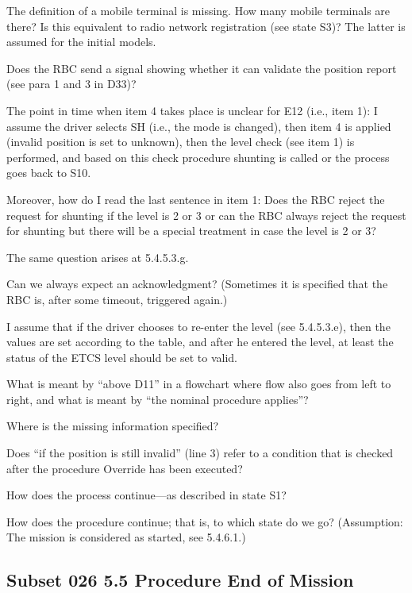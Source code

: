 \documentclass{template/openetcs_article}
\begin{document}
The definition of a mobile terminal is missing. How many mobile terminals are there? Is this equivalent to radio network registration (see state S3)? The latter is assumed for the initial models.

Does the RBC send a signal showing whether it can validate the position report (see para 1 and 3 in D33)?

\label{i:s10}
The point in time when item 4 takes place is unclear for E12 (i.e., item 1): I assume the driver selects SH (i.e., the mode is changed), then item 4 is applied (invalid position is set to unknown), then the level check (see item 1) is performed, and based on this check procedure shunting is called or the process goes back to S10. 

Moreover, how do I read the last sentence in item 1: Does the RBC reject the request for shunting if the level is 2 or 3 or can the RBC always reject the request for shunting but there will be a special treatment in case the level is 2 or 3? 

The same question arises at 5.4.5.3.g.

Can we always expect an acknowledgment? (Sometimes it is specified that the RBC is, after some timeout, triggered again.) 

I assume that if the driver chooses to re-enter the level (see 5.4.5.3.e), then the values are set according to the table, and after he entered the level, at least the status of the ETCS level should be set to valid.

What is meant by ``above D11'' in a flowchart where flow also goes from left to right, and what is meant by ``the nominal procedure applies''?

Where is the missing information specified?

Does ``if the position is still invalid'' (line 3) refer to a condition that is checked after the procedure Override has been executed?

How does the process continue---as described in state S1?

How does the procedure continue; that is, to which state do we go? (Assumption: The mission is considered as started, see 5.4.6.1.) 


\subsection{Subset 026 5.5 Procedure End of Mission}
\end{document}
